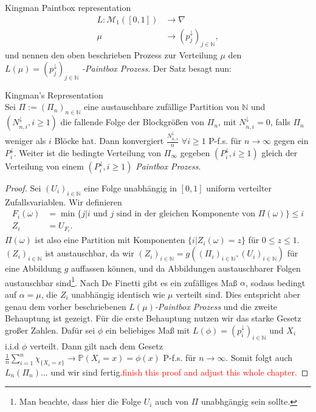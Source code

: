 \begin{section}{Kingman Paintbox representation}
\begin{align*}
L: \mathcal{M}_1([0,1]) &\to \nabla \\
\mu \hspace{20pt} &\to (p_j^\downarrow)_{j \in \mathbb{N}},
\end{align*}
und nennen den oben beschrieben Prozess zur Verteilung $\mu$ den $L(\mu) = (p_j^\downarrow)_{j \in \mathbb{N}}$ \textit{-Paintbox Prozess}. Der Satz besagt nun:
\begin{theorem}
\textnormal{Kingman's Representation} \label{Kingmans representation}\\
    Sei $\Pi := (\Pi_n)_{n \in \mathbb{N}}$ eine austauschbare zufällige Partition von $\mathbb{N}$ und $(N^{\downarrow}_{n,i}, i \geq 1)$ die fallende Folge der Blockgrößen von $\Pi_n$, mit $N_{n,i}^\downarrow = 0$, falls $\Pi_n$ weniger als $i$ Blöcke hat. Dann konvergiert $\frac{N_{n,i}^\downarrow}{n} $ $ \forall i \geq 1$ P-f.s. für $n \to \infty$ gegen ein $P^\downarrow_i$. Weiter ist die bedingte Verteilung von $\Pi_\infty$ gegeben $(P_i^\downarrow, i \geq 1)$ gleich der Verteilung von einem $(P_i^\downarrow, i \geq 1)$ \textit{Paintbox Prozess}.
\end{theorem}
\begin{proof}
Sei $(U_i)_{i \in \mathbb{N}}$ eine Folge unabhängig in $[0,1]$ uniform verteilter Zufallsvariablen. Wir definieren 
\begin{align*}
F_i(\omega) &= \min{\{j| i \text{ und } j \text{ sind in der gleichen Komponente von }  \Pi(\omega)\}} \leq i \\
Z_i &= U_{F_i}.
\end{align*}
$\Pi(\omega)$ ist also eine Partition mit Komponenten $\{i| Z_i(\omega) = z\}$ für $0 \leq z \leq 1$. $(Z_i)_{i \in \mathbb{N}}$ ist austauschbar, da wir $(Z_i)_{i \in \mathbb{N}} = g((\Pi_i)_{i \in \mathbb{N}},(U_i)_{i \in \mathbb{N}})$ für eine Abbildung $g$ auffassen können, und da Abbildungen austauschbarer Folgen austauschbar sind\footnote{Man beachte, dass hier die Folge $U_i$ auch von $\Pi$ unabhgängig sein sollte.}. Nach De Finetti gibt es ein zufälliges Maß $\alpha$, sodass bedingt auf $\alpha = \mu$, die $Z_i$ unabhängig identisch wie $\mu$ verteilt sind. Dies entspricht aber genau dem vorher beschriebenen $L(\mu)$\textit{-Paintbox Prozess} und die zweite Behauptung ist gezeigt. Für die erste Behauptung nutzen wir das starke Gesetz großer Zahlen. Dafür sei $\phi$ ein beliebiges Maß mit $L(\phi) = (p^\downarrow_i)_{i \in \mathbb{N}}$ und $X_i$ i.i.d $\phi$ verteilt. Dann gilt nach dem Gesetz $\frac{1}{n}\sum_{i=1}^{n}\chi_{\{X_i = x\}} \rightarrow \mathbb{P}(X_i = x) = \phi(x)$ P-f.s. für $n \to \infty$. Somit folgt auch $L_n(\Pi_n)...$ und wir sind fertig.\textcolor{red}{finish this proof and adjust this whole chapter.}
\end{proof}

\end{section}